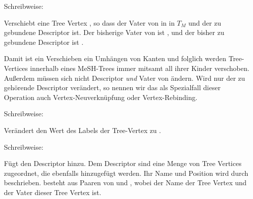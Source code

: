 \begin{definition}
Schreibweise:  \par

Verschiebt eine Tree Vertex , so dass  der Vater von  in in $T_M$ und  der zu  gebundene Descriptor ist. Der bisherige Vater von  ist , und der bisher zu  gebundene Descriptor ist . 
\end{definition}
Damit ist ein Verschieben ein Umhängen von Kanten und folglich werden Tree-Vertices innerhalb eines MeSH-Trees immer mitsamt all ihrer Kinder verschoben. Außerdem müssen sich nicht Descriptor \textit{und} Vater von  ändern. Wird nur der zu  gehörende Descriptor verändert, so nennen wir das als Spezialfall dieser Operation auch Vertex-Neuverknüpfung oder Vertex-Rebinding.


\begin{definition}
Schreibweise:  \par

Verändert den Wert des Labels  der Tree-Vertex  zu .
\end{definition}

\begin{definition}
Schreibweise:  \par

Fügt den Descriptor  hinzu. Dem Descriptor sind eine Menge von Tree Vertices zugeordnet, die ebenfalls hinzugefügt werden. Ihr Name und Position wird durch  beschrieben.  besteht aus Paaren von  und , wobei  der Name der Tree Vertex und  der Vater dieser Tree Vertex ist.
\end{definition}

